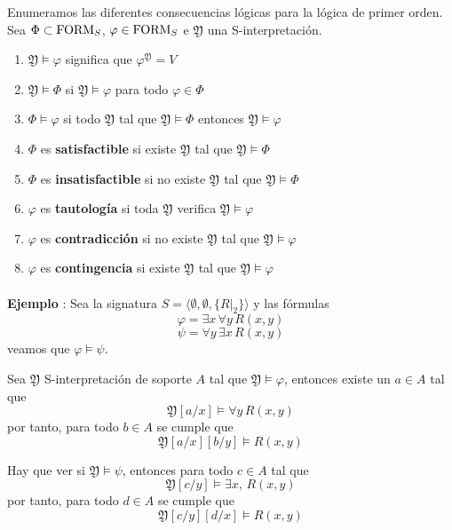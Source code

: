 \begin{definition}
Enumeramos las diferentes consecuencias lógicas para la lógica de primer orden. Sea $\Phi \subset \mbox{FORM}_{S}$, $\varphi \in \mbox{FORM}_{S}$ e $\mathfrak{Y}$ una S-interpretación. 
\begin{enumerate}
	\item $\mathfrak{Y} \models \varphi$ significa que $\varphi^{\mathfrak{Y}}=V$
	\item $\mathfrak{Y} \models \Phi$ si $\mathfrak{Y} \models \varphi$ para todo $\varphi \in \Phi$
	\item $\Phi \models \varphi$ si todo $\mathfrak{Y}$ tal que $\mathfrak{Y} \models \Phi$ entonces $\mathfrak{Y} \models \varphi$
	\item $\Phi$ es \textbf{satisfactible} si existe $\mathfrak{Y}$ tal que $\mathfrak{Y} \models \Phi$
    \item $\Phi$ es \textbf{insatisfactible} si no existe $\mathfrak{Y}$ tal que $\mathfrak{Y} \models \Phi$
    \item $\varphi$ es \textbf{tautología} si toda $\mathfrak{Y}$ verifica $\mathfrak{Y} \models \varphi$
    \item $\varphi$ es \textbf{contradicción} si no existe $\mathfrak{Y}$ tal que $\mathfrak{Y} \models \varphi$
    \item $\varphi$ es \textbf{contingencia} si existe $\mathfrak{Y}$ tal que $\mathfrak{Y} \models \varphi$
\end{enumerate} 
\end{definition}
\paragraph{}
\addtocounter{ej}{1} %
\textbf{Ejemplo }: Sea la signatura $S= \langle \emptyset, \emptyset, \{ R\vert_2\}\rangle$ y las fórmulas 
\begin{equation}
\varphi = \exists x \, \forall y \, R(x, y)
\end{equation}
\begin{equation}
\psi = \forall y \, \exists x \, R(x, y)
\end{equation}
veamos que $\varphi \models \psi$. 

Sea $\mathfrak{Y}$ S-interpretación de soporte $A$ tal que $\mathfrak{Y} \models \varphi$, entonces existe un $a \in A$ tal que 
\[ \mathfrak{Y}[a/x] \models \forall y \, R(x, y) \]
por tanto, para todo $b \in A$ se cumple que 
\[ \mathfrak{Y}[a/x][b/y] \models R(x, y) \] 

Hay que ver si $\mathfrak{Y} \models \psi$, entonces para todo $c \in A$ tal que 
\[ \mathfrak{Y}[c/y] \models \exists x, \,  R(x, y) \]
por tanto, para todo $d \in A$ se cumple que 
\[ \mathfrak{Y}[c/y][d/x] \models R(x, y) \]

